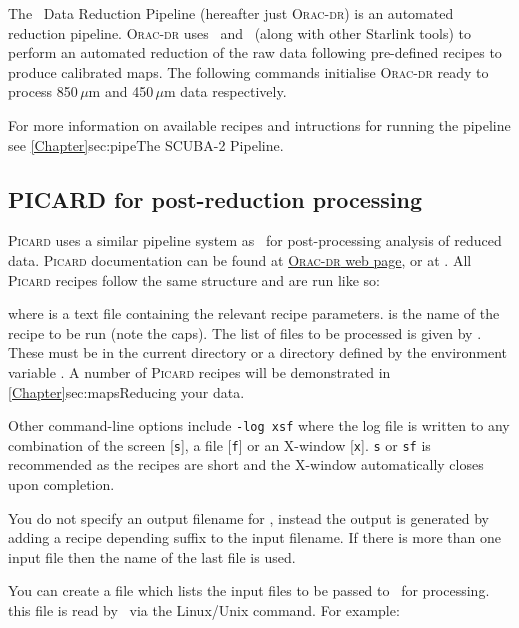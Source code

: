 \documentclass[11pt,oneside,chapters]{starlink}
\begin{document}
The \oracdr\ Data Reduction Pipeline \cite{oracdr} (hereafter just
\textsc{Orac-dr}) is an automated reduction pipeline. \textsc{Orac-dr}
uses \smurf\ and \Kappa\ (along with other Starlink tools) to perform
an automated reduction of the raw data following pre-defined recipes
to produce calibrated maps.  The following commands initialise
\textsc{Orac-dr} ready to process 850\,$\mu$m and 450\,$\mu$m data
respectively.
\begin{terminalv}
\end{terminalv}
For more information on available recipes and intructions for running the pipeline
see \cref{Chapter}{sec:pipe}{The SCUBA-2 Pipeline}.

\subsection{PICARD for post-reduction processing}

\textsc{Picard} uses a similar pipeline system as \oracdr\ for
post-processing analysis of reduced data. \textsc{Picard}
documentation can be found at
\href{http://www.oracdr.org/oracdr/PICARD}{\textsc{Orac-dr} web page},
or at \picardsun. All \textsc{Picard} recipes follow the same
structure and are run like so:
\begin{terminalv}
\end{terminalv}
where  is a text file containing the
relevant recipe parameters.  is the name of the recipe
to be run (note the caps). The list of files to be processed is given
by  . These must be in the current directory or a
directory defined by the environment variable . A
number of \textsc{Picard} recipes will be demonstrated in
\cref{Chapter}{sec:maps}{Reducing your data}.

Other command-line options include \texttt{-log xsf} where the log
file is written to any combination of the screen [\texttt{s}], a file
[\texttt{f}] or an X-window [\texttt{x}]. \texttt{s} or \texttt{sf} is
recommended as the recipes are short and the X-window automatically
closes upon completion.

You do not specify an output filename for \picard, instead the output
is generated by adding a recipe depending suffix to the input
filename. If there is more than one input file then the name of the
last file is used.

You can create a file which lists the input files to be passed to
\picard\ for processing. this file is read by \picard\ via the
Linux/Unix  command. For example:
\end{document}

